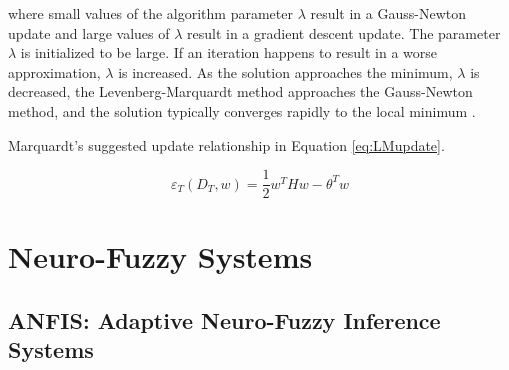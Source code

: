 where small values of the algorithm parameter $\lambda$ result in a Gauss-Newton update and large values of $\lambda$ result in a gradient descent update. The parameter $\lambda$ is initialized to be large. If an iteration happens to result in a worse approximation, $\lambda$ is increased. As the solution approaches the minimum, $\lambda$ is decreased, the Levenberg-Marquardt method approaches the Gauss-Newton method, and the solution typically converges rapidly to the local minimum \cite{marquardt1963algorithm}.

Marquardt’s suggested update relationship in Equation \ref{eq:LMupdate}.

\begin{equation}
\label{eq:LMupdate}
\varepsilon_T(D_T,w) = \frac{1}{2}w^THw - \theta^Tw
\end{equation}

\section{Neuro-Fuzzy Systems}

\subsection{ANFIS: Adaptive Neuro-Fuzzy Inference Systems}

